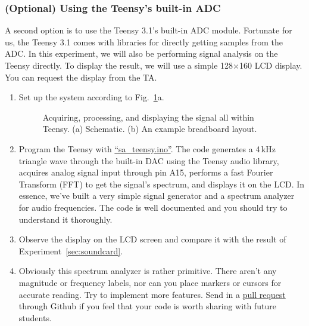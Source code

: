 \documentclass[letterpaper, 11pt]{article}
\begin{document}
\subsubsection{(Optional) Using the Teensy's built-in ADC}
\label{sec:teensy-sa}

A second option is to use the Teensy 3.1's built-in ADC module. Fortunate for us, the Teensy 3.1 comes with libraries for directly getting samples from the ADC. In this experiment, we will also be performing signal analysis on the Teensy directly. To display the result, we will use a simple 128$\times$160 LCD display. You can request the display from the TA. 

\begin{enumerate}
	\item Set up the system according to Fig.~\ref{fig:audio-2}a.
			\begin{figure}[hp]
				\caption{Acquiring, processing, and displaying the signal all within Teensy. (a) Schematic. (b) An example breadboard layout.}
				\label{fig:audio-2}
			\end{figure}
			
	\item Program the Teensy with \href{https://github.com/ucdart/UCD-EEC134/blob/master/labs/lab1/code/sa_teensy/sa_teensy.ino}{``sa\_teensy.ino''}. The code generates a 4\,kHz triangle wave through the built-in DAC using the Teensy audio library,  acquires analog signal input through pin A15, performs a fast Fourier Transform (FFT) to get the signal's spectrum, and displays it on the LCD. In essence, we've built a very simple signal generator and a spectrum analyzer for audio frequencies. The code is well documented and you should try to understand it thoroughly. 
	
	\item Observe the display on the LCD screen and compare it with the result of Experiment~\ref{sec:soundcard}.
	
	\item Obviously this spectrum analyzer is rather primitive. There aren't any magnitude or frequency labels, nor can you place markers or cursors for accurate reading. Try to implement more features. Send in a \href{https://help.github.com/articles/using-pull-requests/}{pull request} through Github if you feel that your code is worth sharing with future students. 
	
\end{enumerate}
\end{document}
